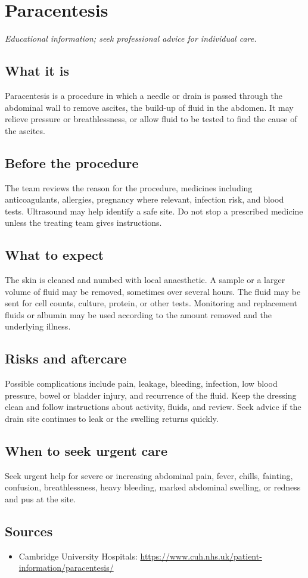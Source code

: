 \chapter{Paracentesis}

\medskip
\noindent\textit{Educational information; seek professional advice for individual care.}

\section*{What it is}
Paracentesis is a procedure in which a needle or drain is passed through the abdominal wall to remove ascites, the build-up of fluid in the abdomen. It may relieve pressure or breathlessness, or allow fluid to be tested to find the cause of the ascites.

\section*{Before the procedure}
The team reviews the reason for the procedure, medicines including anticoagulants, allergies, pregnancy where relevant, infection risk, and blood tests. Ultrasound may help identify a safe site. Do not stop a prescribed medicine unless the treating team gives instructions.

\section*{What to expect}
The skin is cleaned and numbed with local anaesthetic. A sample or a larger volume of fluid may be removed, sometimes over several hours. The fluid may be sent for cell counts, culture, protein, or other tests. Monitoring and replacement fluids or albumin may be used according to the amount removed and the underlying illness.

\section*{Risks and aftercare}
Possible complications include pain, leakage, bleeding, infection, low blood pressure, bowel or bladder injury, and recurrence of the fluid. Keep the dressing clean and follow instructions about activity, fluids, and review. Seek advice if the drain site continues to leak or the swelling returns quickly.

\section*{When to seek urgent care}
Seek urgent help for severe or increasing abdominal pain, fever, chills, fainting, confusion, breathlessness, heavy bleeding, marked abdominal swelling, or redness and pus at the site.

\section*{Sources}
\begin{itemize}
\item Cambridge University Hospitals: \url{https://www.cuh.nhs.uk/patient-information/paracentesis/}
\end{itemize}
